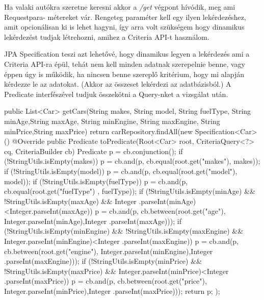 
Ha valaki autókra szeretne keresni akkor a \textit{/get} végpont hívódik, meg ami Requestpara-
métereket vár. Rengeteg paraméter kell egy ilyen lekérdezéshez, amit opcionálisan ki is lehet hagyni, így arra volt szükségem hogy dinamikus lekérdezést tudjak létrehozni, amihez a Criteria API-t használom.

JPA Specification teszi azt lehetővé, hogy dinamikus legyen a lekérdezés ami a Criteria API-ra épül, tehát nem kell minden adatnak szerepelnie benne, vagy éppen úgy is működik, ha nincsen benne szereplő kritérium, hogy mi alapján kérdezze le az adatokat. (Akkor az összeset lekérdezi az adatbázisból.) A Predicate interfészével tudjuk összekötni a Query-nket a vizsgálat után.

\begin{java}
public List<Car> getCars(String makes, String model,
      String fuelType, String minAge,String maxAge,
      String minEngine, String maxEngine, 
      String minPrice,String maxPrice) {
  return carRepository.findAll(new Specification<Car>() {
    @Override
    public Predicate toPredicate(Root<Car> root,
     CriteriaQuery<?> cq, CriteriaBuilder cb) {
        Predicate p = cb.conjunction();
        if (!StringUtils.isEmpty(makes)) {
            p = cb.and(p, cb.equal(root.get("makes"), makes));
        }
        if (!StringUtils.isEmpty(model)) {
            p = cb.and(p, cb.equal(root.get("model"), model));
        }
        if (!StringUtils.isEmpty(fuelType)) {
            p = cb.and(p, cb.equal(root.get("fuelType")
                                       , fuelType));
        }
        if (!StringUtils.isEmpty(minAge) && 
            !StringUtils.isEmpty(maxAge) &&
            Integer
            .parseInt(minAge)<Integer.parseInt(maxAge)) {
            p = cb.and(p, cb.between(root.get("age"),
            Integer.parseInt(minAge),Integer
                                    .parseInt(maxAge)));
        }
        if (!StringUtils.isEmpty(minEngine) &&
            !StringUtils.isEmpty(maxEngine) &&
            Integer.parseInt(minEngine)<Integer
                                       .parseInt(maxEngine)) {
            p = cb.and(p, cb.between(root.get("engine"),
            Integer.parseInt(minEngine),Integer
                                       .parseInt(maxEngine)));
        }
        if (!StringUtils.isEmpty(minPrice) &&
            !StringUtils.isEmpty(maxPrice) &&
            Integer.parseInt(minPrice)<Integer
                                       .parseInt(maxPrice)) {
             p = cb.and(p, cb.between(root.get("price"),
             Integer.parseInt(minPrice),Integer
                                       .parseInt(maxPrice)));
         }
         return p;
     }
  });
}
\end{java}

